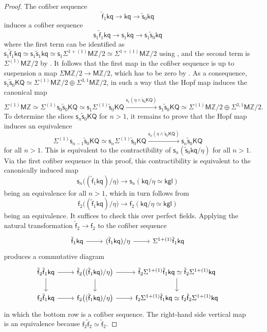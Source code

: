 \documentclass[11pt,hyp,english]{article}
\newcommand{\Z}{\mathbb{Z}}
\newcommand{\kgl}{\mathsf{kgl}}
\newcommand{\KQ}{\mathsf{KQ}}
\newcommand{\kq}{\mathsf{kq}}
\newcommand{\MZ}{\mathsf{M}\Z}
\newcommand{\s}{\mathsf{s}}
\newcommand{\vs}{\tilde{\mathsf{s}}}
\newcommand{\f}{\mathsf{f}}
\newcommand{\vf}{\tilde{{\mathsf{f}}}}
\let\smash=\wedge
\theoremstyle{definition}
\begin{document}
\begin{proof}
The cofiber sequence
\[ \vf_1\kq \to \kq \to \vs_0\kq\]
induces a cofiber sequence
\begin{equation}\label{eq:1-sliceV} 
\s_1\vf_1\kq \to \s_1\kq\to \s_1\vs_0\kq 
\end{equation}
where the first term can be identified
as $\s_1\vf_1\kq\simeq \s_1\vs_1\kq\simeq \s_1\Sigma^{1+(1)}\MZ/2\simeq \Sigma^{1+(1)}\MZ/2$ using , and the second term is $\Sigma^{(1)}\MZ/2$ by .
It follows that the first map in the cofiber sequence is up to suspension a map $\Sigma\MZ/2 \to \MZ/2$, which has to be zero by .
As a consequence, $\s_1\vs_0\KQ\simeq \Sigma^{(1)}\MZ/2\oplus  \Sigma^{3,1}\MZ/2$, in such a way that the Hopf map induces the canonical map
\[ \Sigma^{(1)}\MZ \simeq \Sigma^{(1)}\s_0\vs_0\KQ\simeq \s_1\Sigma^{(1)}\vs_0\KQ \xrightarrow{\s_1(\eta\smash \vs_0\KQ)} \s_1\vs_0\KQ\simeq \Sigma^{(1)}\MZ/2 \oplus  \Sigma^{3,1}\MZ/2.\]
To determine the slices $\s_n\vs_0\KQ$ for $n>1$, it remains to prove that the Hopf map induces an equivalence 
\[ \Sigma^{(1)}\s_{n-1}\vs_0\KQ\simeq \s_n\Sigma^{(1)}\vs_0\KQ \xrightarrow{\s_n(\eta\smash \vs_0\KQ)} \s_n\vs_0\KQ\]
for all $n>1$.
This is equivalent to the contractibility of $\s_n(\vs_0\kq/\eta)$ for all $n>1$.
Via the first cofiber sequence in this proof, this contractibility is equivalent to the canonically induced map
\[ \s_n\bigl((\vf_1\kq)/\eta\bigr) \to \s_n(\kq/\eta\simeq \kgl)\]
being an equivalence for all $n>1$, which in turn follows from 
\[ \f_2\bigl((\vf_1\kq)/\eta\bigr) \to \f_2(\kq/\eta\simeq \kgl)\]
being an equivalence.
It suffices to check this over perfect fields.
Applying the natural transformation $\vf_2\to \f_2$ to the cofiber sequence
\[
\begin{tikzcd}
\vf_1\kq\ar[r]  & 
(\vf_1\kq)/\eta\ar[r] & 
\Sigma^{1+(1)}\vf_1\kq
\end{tikzcd}
\]      
produces a commutative diagram
\[
\begin{tikzcd}
\vf_2\vf_1\kq\ar[r] \ar[d] & 
\vf_2\bigl((\vf_1\kq)/\eta\bigr)\ar[r] \ar[d] & 
\vf_2\Sigma^{1+(1)}\vf_1\kq\simeq \vf_2\Sigma^{1+(1)}\kq \ar[d] \\
\f_2\vf_1\kq \ar[r] &
\f_2\bigl((\vf_1\kq)/\eta\bigr) \ar[r] &
\f_2\Sigma^{1+(1)}\vf_1\kq\simeq \f_2\vf_2\Sigma^{1+(1)}\kq
\end{tikzcd}
\] 
in which the bottom row is a cofiber sequence.
The right-hand side vertical map is an equivalence because $\f_2\vf_2\simeq \vf_2$.

\end{proof}
\end{document}
